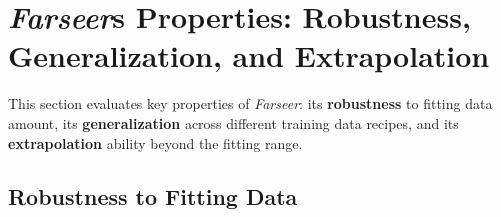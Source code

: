 \documentclass{article}
\begin{document}
\section{\textit{Farseer}s Properties: Robustness, Generalization, and Extrapolation}
\label{sec:scaling_law_properties}

This section evaluates key properties of \textit{Farseer}: its \textbf{robustness} to fitting data amount, its \textbf{generalization} across different training data recipes, and its \textbf{extrapolation} ability beyond the fitting range.

\subsection{Robustness to Fitting Data} \label{sec:robustness}




\end{document}
